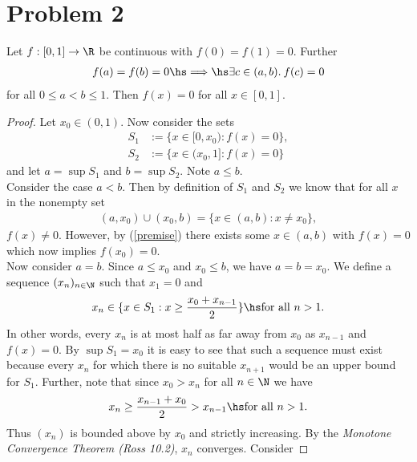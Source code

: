 \documentclass{article}
\begin{document}
\section*{Problem 2}

\begin{claim*}
    Let $f:[0,1]\to\R$ be continuous with $f(0)=f(1)=0$. Further
    \begin{align}
        \label{premise}
        f(a)=f(b)=0 \hs\Longrightarrow\hs \exists c\in(a,b).\: f(c)=0
    \end{align}
    for all $0\leq a<b\leq 1$. Then $f(x)=0$ for all $x\in[0,1]$.
\end{claim*}

\begin{proof}
    Let $x_0\in(0,1)$. Now consider the sets
    \begin{align*}
        S_1 & := \{x\in[0,x_0) : f(x) = 0\}, \\
        S_2 & := \{x\in(x_0,1] : f(x) = 0\}
    \end{align*}
    and let $a=\sup S_1$ and $b=\sup S_2$. Note $a\leq b$.\\
    \indent Consider the case $a<b$. Then by definition of $S_1$ and $S_2$
    we know that for all $x$ in the nonempty set
    \begin{align*}
        (a,x_0)\cup(x_0,b)=\{x\in(a,b):x\not=x_0\},
    \end{align*}
    $f(x)\not=0$.
    However, by (\ref{premise}) there exists some $x\in(a,b)$ with $f(x)=0$
    which now implies $f(x_0)=0$.\\
    \indent Now consider $a=b$. Since $a\leq x_0$ and $x_0\leq b$, we have
    $a=b=x_0$. We define a sequence $(x_n)_{n\in\N}$ such that $x_1=0$ and
    \begin{align*}
        x_n \in\{x\in S_1 : x\geq \frac{x_0+x_{n-1}}{2}\} \hs\text{for all }n>1.
    \end{align*}
    In other words, every $x_n$ is at most half as far away from $x_0$
    as $x_{n-1}$ and $f(x)=0$. By $\sup S_1 = x_0$ it is easy to see that such
    a sequence must exist because every $x_n$ for which there is no suitable
    $x_{n+1}$ would be an upper bound for $S_1$. Further, note that since $x_0>x_n$
    for all $n\in\N$ we have
    \begin{align*}
        x_n \geq \frac{x_{n-1}+x_0}{2} > x_{n-1} \hs\text{for all }n>1.
    \end{align*}
    Thus $(x_n)$ is bounded above by $x_0$ and strictly increasing. By the
    \emph{Monotone Convergence Theorem (Ross 10.2)}, $x_n$ converges. Consider

\end{proof}
\end{document}
